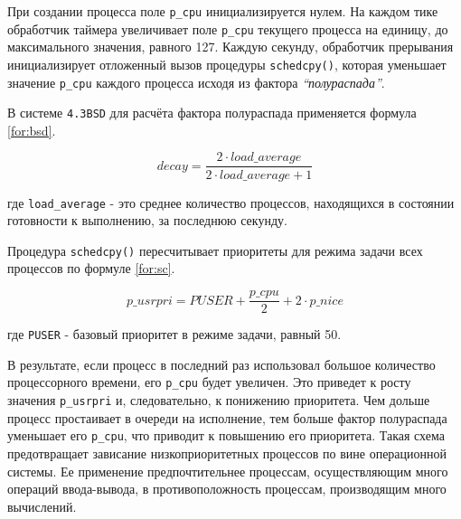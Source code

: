 При создании процесса поле \texttt{p\_cpu} инициализируется нулем. На каждом
тике обработчик таймера увеличивает поле \texttt{p\_cpu} текущего процесса на
единицу, до максимального значения, равного 127. Каждую секунду, обработчик
прерывания инициализирует отложенный вызов процедуры \texttt{schedcpy()},
которая уменьшает значение \texttt{p\_cpu} каждого процесса исходя из фактора
\textit{``полураспада''}.

\clearpage
В системе \texttt{4.3BSD} для расчёта фактора полураспада применяется формула
\eqref{for:bsd}.

\begin{equation}
    \label{for:bsd}
    decay = \frac{2 \cdot load\_average}{2 \cdot load\_average + 1}
\end{equation}

где \texttt{load\_average} - это среднее количество процессов, находящихся в
состоянии готовности к выполнению, за последнюю секунду.

Процедура \texttt{schedcpy()} пересчитывает приоритеты для режима задачи всех
процессов по формуле \eqref{for:sc}.

\begin{equation}
    \label{for:sc}
    p\_usrpri = PUSER + \frac{p\_cpu}{2} + 2 \cdot p\_nice
\end{equation}

где \texttt{PUSER} - базовый приоритет в режиме задачи, равный 50.

В результате, если процесс в последний раз использовал большое количество
процессорного времени, его \texttt{p\_cpu} будет увеличен. Это приведет к росту
значения \texttt{p\_usrpri} и, следовательно, к понижению приоритета. Чем
дольше процесс простаивает в очереди на исполнение, тем больше фактор
полураспада уменьшает его \texttt{p\_cpu}, что приводит к повышению его
приоритета. Такая схема предотвращает зависание низкоприоритетных процессов по
вине операционной системы. Ее применение предпочтительнее процессам,
осуществляющим много операций ввода-вывода, в противоположность процессам,
производящим много вычислений.

